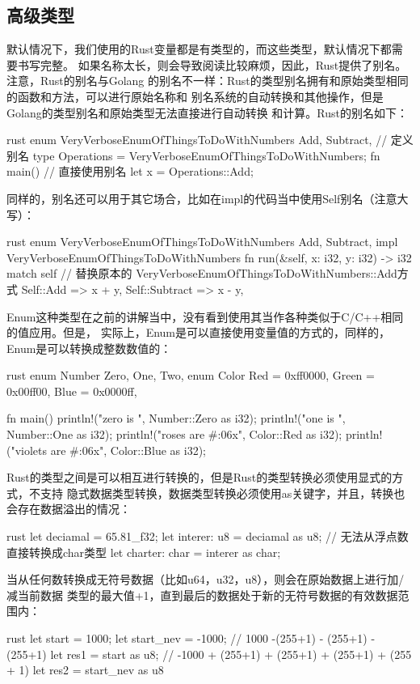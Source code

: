 \subsection{高级类型}
默认情况下，我们使用的Rust变量都是有类型的，而这些类型，默认情况下都需要书写完整。
如果名称太长，则会导致阅读比较麻烦，因此，Rust提供了别名。注意，Rust的别名与Golang
的别名不一样：Rust的类型别名拥有和原始类型相同的函数和方法，可以进行原始名称和
别名系统的自动转换和其他操作，但是Golang的类型别名和原始类型无法直接进行自动转换
和计算。Rust的别名如下：
\begin{code-block}{rust}
enum VeryVerboseEnumOfThingsToDoWithNumbers {
    Add,
    Subtract,
}
// 定义别名
type Operations = VeryVerboseEnumOfThingsToDoWithNumbers;
fn main() {
    // 直接使用别名
    let x = Operations::Add;
}
\end{code-block}
同样的，别名还可以用于其它场合，比如在impl的代码当中使用Self别名（注意大写）：
\begin{code-block}{rust}
enum VeryVerboseEnumOfThingsToDoWithNumbers {
    Add,
    Subtract,
}
impl VeryVerboseEnumOfThingsToDoWithNumbers {
    fn run(&self, x: i32, y: i32) -> i32 {
        match self {
            // 替换原本的 VeryVerboseEnumOfThingsToDoWithNumbers::Add方式
            Self::Add => x + y,
            Self::Subtract => x - y,
        }
    }
}
\end{code-block}

Enum这种类型在之前的讲解当中，没有看到使用其当作各种类似于C/C++相同的值应用。但是，
实际上，Enum是可以直接使用变量值的方式的，同样的，Enum是可以转换成整数数值的：
\begin{code-block}{rust}
enum Number {
    Zero,
    One,
    Two,
}
enum Color {
    Red = 0xff0000,
    Green = 0x00ff00,
    Blue = 0x0000ff,
}

fn main() {
    println!("zero is {}", Number::Zero as i32);
    println!("one is {}", Number::One as i32);
    println!("roses are #{:06x}", Color::Red as i32);
    println!("violets are #{:06x}", Color::Blue as i32);
}
\end{code-block}

Rust的类型之间是可以相互进行转换的，但是Rust的类型转换必须使用显式的方式，不支持
隐式数据类型转换，数据类型转换必须使用as关键字，并且，转换也会存在数据溢出的情况：
\begin{code-block}{rust}
let deciamal = 65.81_f32;
let interer: u8 = deciamal as u8;
// 无法从浮点数直接转换成char类型
let charter: char = interer as char;
\end{code-block}
当从任何数转换成无符号数据（比如u64，u32，u8），则会在原始数据上进行加/减当前数据
类型的最大值+1，直到最后的数据处于新的无符号数据的有效数据范围内：
\begin{code-block}{rust}
let start = 1000;
let start_nev = -1000;
// 1000 -(255+1) - (255+1) - (255+1)
let res1 = start as u8;
// -1000 + (255+1) + (255+1) + (255+1) + (255 + 1)
let res2 = start_nev as u8
\end{code-block}

